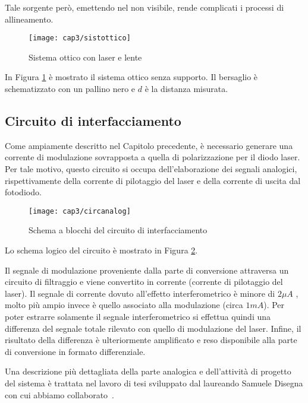 Tale sorgente però, emettendo nel non visibile, rende complicati i processi di allineamento.
\begin{figure}  
  \begin{center}
    \texttt{[image: cap3/sistottico]}
    \caption{Sistema ottico con laser e lente}
    \label{sistottico}
  \end{center}
\end{figure}
In Figura \ref{sistottico} è mostrato il sistema ottico senza supporto. Il bersaglio è schematizzato con un pallino nero e $d$ è la distanza misurata.

\subsection{Circuito di interfacciamento}
Come ampiamente descritto nel Capitolo precedente, è necessario generare una corrente di modulazione sovrapposta a quella di polarizzazione per il diodo laser. Per tale motivo, questo circuito si occupa dell'elaborazione dei segnali analogici, rispettivamente della corrente di pilotaggio del laser e della corrente di uscita dal fotodiodo.
\begin{figure}[H]
  \begin{center}
    \texttt{[image: cap3/circanalog]}
    \caption{Schema a blocchi del circuito di interfacciamento}
    \label{circanalog}
  \end{center}
\end{figure}

Lo schema logico del circuito è mostrato in Figura \ref{circanalog}. 

Il segnale di modulazione proveniente dalla parte di conversione attraversa un circuito di filtraggio e viene convertito in corrente (corrente di pilotaggio del laser).
Il segnale di corrente dovuto all'effetto interferometrico è minore di $2 \mu A$ , molto più ampio invece è quello associato alla modulazione (circa $1mA$). Per poter estrarre solamente il segnale interferometrico si effettua quindi una differenza del segnale totale rilevato con quello di modulazione del laser. Infine, il risultato della differenza è ulteriormente amplificato e reso disponibile alla parte di conversione in formato differenziale.

Una descrizione più dettagliata della parte analogica e dell'attività di progetto del sistema è trattata nel lavoro di tesi sviluppato dal laureando Samuele Disegna con cui abbiamo collaborato~\cite{thesissmldis}.

